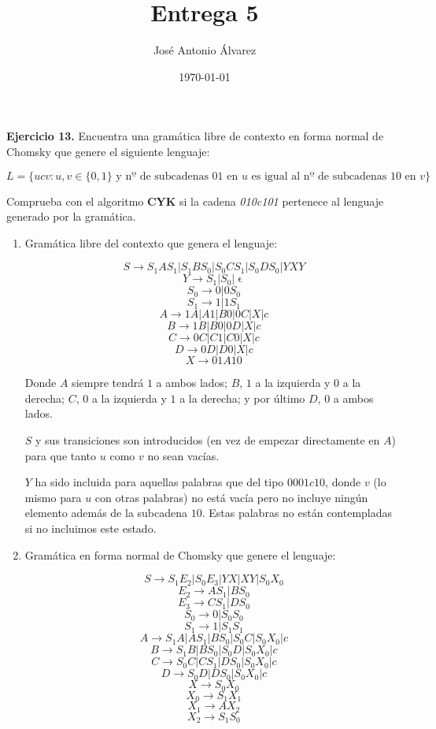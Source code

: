 \documentclass[11pt,a4paper]{article}
\title{Entrega 5}
\author{José Antonio Álvarez}
\date{\today}
\let\epsilon\upvarepsilon
\begin{document}
\maketitle

\textbf{Ejercicio 13.} Encuentra una gramática libre de contexto en forma normal de Chomsky que genere el siguiente lenguaje:

$$ L = \{ucv : u, v \in \{0, 1\} \text{ y nº de subcadenas } 01 \text{ en } u \text{ es igual al nº de subcadenas } 10 \text{ en } v\} $$

Comprueba con el algoritmo \textbf{CYK} si la cadena \emph{010c101} pertenece al lenguaje generado por la gramática. \\

\begin {enumerate} 

\item Gramática libre del contexto que genera el lenguaje:
	
$$ S \rightarrow S_1AS_1 | S_1BS_0 | S_0CS_1 | S_0DS_0 | YXY $$
$$ Y \rightarrow S_1 | S_0 | \epsilon $$
$$ S_0 \rightarrow 0 | 0S_0$$
$$ S_1 \rightarrow 1 | 1S_1$$
$$ A \rightarrow 1A | A1 | B0 | 0C | X | c $$
$$ B \rightarrow 1B | B0 | 0D | X | c $$
$$ C \rightarrow 0C | C1 | C0 | X | c $$
$$ D \rightarrow 0D | D0 | X | c $$
$$ X \rightarrow 01A10 $$

Donde $A$ siempre tendrá $1$ a ambos lados; $B$, $1$ a la izquierda y $0$ a la derecha; $C$, $0$ a la izquierda y $1$ a la derecha; y por último $D$, $0$ a ambos lados.

$S$ y sus transiciones son introducidos (en vez de empezar directamente en $A$) para que tanto $u$ como $v$ no sean vacías.

$Y$ ha sido incluida para aquellas palabras que del tipo $0001c10$, donde $v$ (lo mismo para $u$ con otras palabras) no está vacía pero no incluye ningún elemento además de la subcadena $10$. Estas palabras no están contempladas si no incluimos este estado.

\item Gramática en forma normal de Chomsky que genere el lenguaje:

$$ S \rightarrow S_1E_2 | S_0E_3 | YX | XY | S_0X_0$$
$$ E_2 \rightarrow AS_1 | BS_0 $$
$$ E_3 \rightarrow CS_1 | DS_0 $$
$$ S_0 \rightarrow 0 | S_0S_0$$
$$ S_1 \rightarrow 1 | S_1S_1$$
$$ A \rightarrow S_1A | AS_1 | BS_0 | S_0C | S_0X_0 | c $$
$$ B \rightarrow S_1B | BS_0 | S_0D | S_0X_0 | c $$
$$ C \rightarrow S_0C | CS_1 | DS_0 | S_0X_0 | c $$
$$ D \rightarrow S_0D | DS_0 | S_0X_0 | c $$
$$ X \rightarrow S_0X_0$$
$$ X_0 \rightarrow S_1X_1$$
$$ X_1 \rightarrow AX_2$$
$$ X_2 \rightarrow S_1S_0$$


\end{enumerate}
\end{document}
